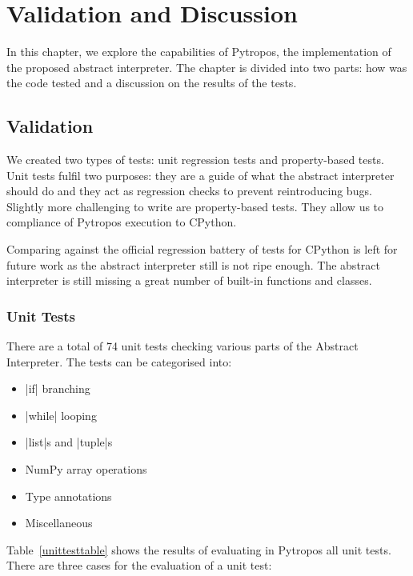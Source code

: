 \chapter{Validation and Discussion}\label{validation-and-discussion}

In this chapter, we explore the capabilities of Pytropos, the implementation of the
proposed abstract interpreter. The chapter is divided into two parts: how was the code
tested and a discussion on the results of the tests.

\section{Validation}\label{validation}

We created two types of tests: unit regression tests and property-based tests. Unit tests
fulfil two purposes: they are a guide of what the abstract interpreter should do and they
act as regression checks to prevent reintroducing bugs. Slightly more challenging to
write are property-based tests. They allow us to compliance of Pytropos execution to
CPython.

Comparing against the official regression battery of tests for CPython is left for future
work as the abstract interpreter still is not ripe enough. The abstract interpreter is
still missing a great number of built-in functions and classes.

\subsection{Unit Tests}\label{unit-tests}

There are a total of 74 unit tests checking various parts of the Abstract Interpreter. The
tests can be categorised into:

\begin{itemize}
\tightlist
\item \pycode|if| branching
\item \pycode|while| looping
\item \pycode|list|s and \pycode|tuple|s
\item NumPy array operations
\item Type annotations
\item Miscellaneous
\end{itemize}

Table~\ref{unittesttable} shows the results of evaluating in Pytropos all unit tests.
There are three cases for the evaluation of a unit test:

